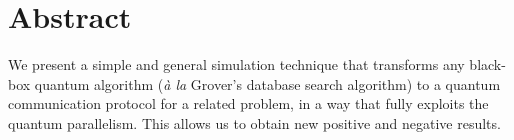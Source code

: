 \newcommand{\eprf}{\bbox}
\newcommand{\beqn}{\begin{equation}}
\newcommand{\eeqn}{\end{equation}}
\newcommand{\wbox}{\mbox{$\sqcap$\llap{$\sqcup$}}}
\newcommand{\bbox}{\vrule height7pt width4pt depth1pt}
\newcommand{\qed}{\bbox}
\def\sup{^}
\def\ra{\rightarrow}
\def\zok{\{0,1\}^k}
\def\zo{\{0,1\}}
\def\zom{\{0,1\}^m}
\def\zon{\{0,1\}^n}
\def\zor{\{0,1\}^r}
\def\zol{\{0,1\}^l}
\def\Tp{Tchebyshef polynomial}
\def\Tps{TchebysDeto be the maximafine $A(n,d)$ l size of a code with distance 
$d$hef polynomials}

\newcommand{\rarrow}{\rightarrow}
\newcommand{\larrow}{\leftarrow}

%
\def\half{\textstyle{1 \over 2}}
\def\sqhalf{\textstyle{1 \over \sqrt{2}}}
\def\01{\{0,1\}}
\def\x{\times}
\def\ox{\otimes}
\def\xor{+}
\def\AND{}
\def\Q{\mbox{\sf Q}}
\def\e{\varepsilon}
\def\ket#1{\mbox{$| #1 \rangle$}}
\def\sqm#1{\textstyle{\sqrt{#1}}}
\def\half{\textstyle{1 \over 2}}
\def\one{\mbox{\boldmath $1$}}
\def\nl{\newline}
\def\ni{\noindent}
\def\ii{\hspace*{8mm}}
\def\ee{\vspace*{1mm}}
\def\eee{\vspace*{5mm}}
\def\F{{\cal F}}
\def\H{{\cal H}}
\def\loud#1{\noindent{\bf #1 }}
\def\EQ{\mbox{\it EQ\/}}
\def\EQprime{\mbox{\it EQ\/}^{\prime}}
\def\IP{\mbox{\it IP\/}}
\def\DISJ{\mbox{\it DISJ\/}}
\def\PARITY{\mbox{\it PARITY\/}}
\def\BAL{\mbox{\it BAL\/}}
\def\STAB{\mbox{\it STAB\/}}
\def\OR{\mbox{\it OR\/}}
\def\AND{\mbox{\it AND\/}}
\def\MAJ{\mbox{\it MAJORITY\/}}
\def\MODq{\mbox{\it MOD}_q}
\def\SIGMA{\mbox{\it SIGMA}}
\def\PI{\mbox{\it PI}}

\overfullrule=0pt
\def\setof#1{\lbrace #1 \rbrace}
\newcommand{\card}[1]{{\mathopen{|\!|}#1\mathclose{|\!|}}}
\newcommand{\pair}[1]{{\mathopen<#1\mathclose>}}
\section*{Abstract}
We present a simple and general simulation technique that transforms any
black-box quantum algorithm ({\it \`a la} Grover's database search algorithm)
to a quantum communication protocol for a related problem, in a way
that fully exploits the quantum parallelism. This allows us to obtain
new positive and negative results.

